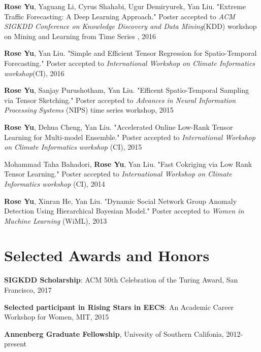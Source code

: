 \documentclass[margin,line]{res}
\begin{document}
\begin{resume}
{\bf Rose Yu}, Yaguang Li, Cyrus Shahabi, Ugur Demiryurek, Yan Liu. "Extreme Traffic Forecasting: A Deep Learning Approach." Poster accepted to \textit{ACM SIGKDD Conference on Knowledge Discovery and Data Mining}(KDD)  workshop on Mining and Learning from Time Series , 2016


{\bf Rose Yu}, Yan Liu. "Simple and Efficient Tensor Regression for Spatio-Temporal Forecasting." Poster accepted to \textit{International Workshop on Climate Informatics workshop}(CI), 2016

{\bf Rose Yu}, Sanjay Purushotham, Yan Liu. "Efficent Spatio-Temporal Sampling via Tensor Sketching." Poster accepted to \textit{Advances in Neural Information Processing Systems}  (NIPS) time series workshop, 2015   


{\bf Rose Yu}, Dehua Cheng, Yan Liu. "Accelerated Online Low-Rank Tensor Learning for Multi-model Ensemble." Poster accepted to \textit{International Workshop on Climate Informatics workshop} (CI), 2015

Mohammad Taha Bahadori, {\bf Rose Yu}, Yan Liu. "Fast Cokriging via Low Rank Tensor Learning." Poster accepted to \textit{International Workshop on Climate Informatics workshop} (CI), 2014

{\bf Rose Yu}, Xinran He, Yan Liu. "Dynamic Social Network Group Anomaly Detection Using Hierarchical Bayesian Model." Poster accepted to \textit{Women in Machine Learning } (WiML), 2013


\section{\sc Selected Awards and Honors} 

\textbf{SIGKDD Scholarship}: ACM 50th Celebration of the Turing Award, San Francisco, 2017

\textbf{Selected participant in Rising Stars in EECS}: An Academic Career Workshop for Women, MIT, 2015

\textbf{Annenberg Graduate Fellowship}, Univesity of Southern Califonia, 2012-present








\end{resume}
\end{document}
